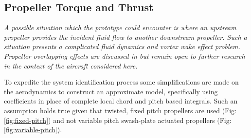\subsection{Propeller Torque and Thrust}
\label{subsec:dynamics.aero.bem}
\emph{\color{Gray} A possible situation which the prototype could encounter is where an upstream propeller provides the incident fluid flow to another downstream propeller. Such a situation presents a complicated fluid dynamics and vortex wake effect problem. Propeller overlapping effects are discussed in \cite{configurationpropulsion} but remain open to further research in the context of the aircraft considered here.}
\par
To expedite the system identification process some simplifications are made on the aerodynamics to construct an approximate model, specifically using coefficients in place of complete local chord and pitch based integrals. Such an assumption holds true given that twisted, fixed pitch propellers are used (Fig:\ref{fig:fixed-pitch}) and not variable pitch swash-plate actuated propellers (Fig:\ref{fig:variable-pitch}).
